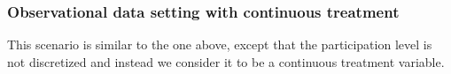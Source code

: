 \documentclass[10pt,letterpaper]{article}
\begin{document}
	\subsubsection{Observational data setting with continuous treatment}
	This scenario is similar to the one above, except that the participation level is not discretized and instead we consider it to be a continuous treatment variable. 
	
	
	
	
	  
	
\end{document}
